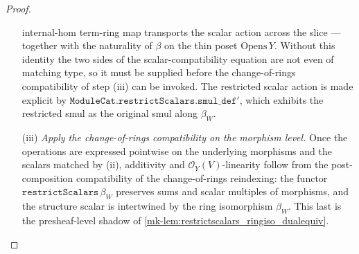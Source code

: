 \begin{proof}
\begin{enumerate}
      internal-hom term-ring map transports the scalar action across the slice --- together with
      the naturality of \(\beta\) on the thin poset \(\mathrm{Opens}\,Y\). Without this identity
      the two sides of the scalar-compatibility equation are not even of matching type, so it
      must be supplied before the change-of-rings compatibility of step (iii) can be invoked.
      The restricted scalar action is made explicit by
      \(\mathtt{ModuleCat.restrictScalars.smul\_def'}\), which exhibits the restricted smul
      as the original smul along \(\beta_W\).
    \item[(iii)] \emph{Apply the change-of-rings compatibility on the morphism level.} Once the
      operations are expressed pointwise on the underlying morphisms and the scalars matched by
      (ii), additivity and
      \(\mathcal{O}_Y(V)\)-linearity follow from the post-composition compatibility of the
      change-of-rings reindexing: the functor \(\mathtt{restrictScalars}\,\beta_W\) preserves sums
      and scalar multiples of morphisms, and the structure scalar is intertwined by the ring
      isomorphism \(\beta_W\). This last is the presheaf-level shadow of
      \ref{mk-lem:restrictscalars_ringiso_dualequiv}.
  \end{enumerate}


\end{proof}
